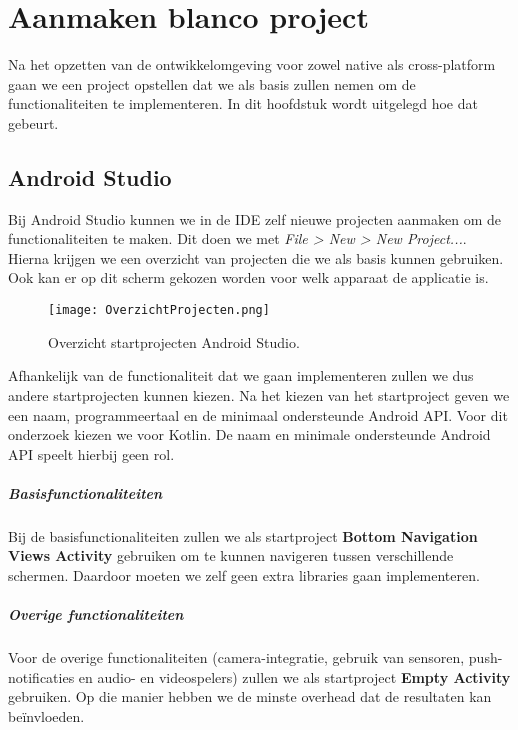 
\chapter{Aanmaken blanco project}%
\label{ch:projecten}

Na het opzetten van de ontwikkelomgeving voor zowel native als cross-platform gaan 
we een project opstellen dat we als basis zullen nemen om de functionaliteiten te 
implementeren. In dit hoofdstuk wordt uitgelegd hoe dat gebeurt.

\section{Android Studio}
Bij Android Studio kunnen we in de IDE zelf nieuwe projecten aanmaken om de 
functionaliteiten te maken. Dit doen we met \textit{File > New > New Project...}. 
Hierna krijgen we een overzicht van projecten die we als basis kunnen gebruiken. Ook 
kan er op dit scherm gekozen worden voor welk apparaat de applicatie is.
\begin{figure}[H]
    \centering
    \texttt{[image: OverzichtProjecten.png]}
    \caption{Overzicht startprojecten Android Studio.}
\end{figure}
Afhankelijk van de functionaliteit dat we gaan implementeren zullen we dus andere 
startprojecten kunnen kiezen. Na het kiezen van het startproject geven we een naam, 
programmeertaal en de minimaal ondersteunde Android API. Voor dit onderzoek kiezen we 
voor Kotlin. De naam en minimale ondersteunde Android API speelt hierbij geen rol.

\paragraph{Basisfunctionaliteiten}
\label{par:basisfunctionaliteiten}
Bij de basisfunctionaliteiten zullen we als startproject 
\textbf{Bottom Navigation Views Activity} gebruiken om te kunnen navigeren tussen 
verschillende schermen. Daardoor moeten we zelf geen extra libraries gaan implementeren.

\paragraph{Overige functionaliteiten}
Voor de overige functionaliteiten (camera-integratie, gebruik van sensoren, 
push-notificaties en audio- en videospelers) zullen we als startproject 
\textbf{Empty Activity} gebruiken. Op die manier hebben we de minste \gls{overhead} 
dat de resultaten kan beïnvloeden.

